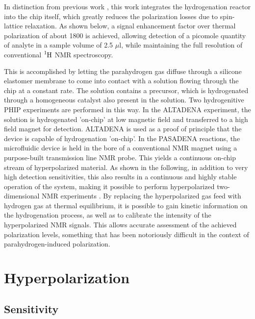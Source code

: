  In distinction from previous work
 \cite{bhattacharya2007towards,chekmenev2008pasadena,
 chekmenev2009hyperpolarized,shchepin2014parahydrogen,
 Reineri:2015he,cavallari201813,eills2017singlet,Lehmkuhl:2018cd},
 this work integrates the hydrogenation reactor into the chip itself, which greatly
 reduces the polarization losses due to spin-lattice relaxation.
 As shown below, a signal enhancement factor over thermal polarization
 of about 1800 is achieved, allowing detection of a
 picomole quantity of analyte in a sample volume of 2.5 $\mu$l,
 while maintaining the full resolution of conventional $\ce{^1H}$
 NMR spectroscopy.

 This is accomplished by letting the parahydrogen gas diffuse through a
 silicone elastomer membrane \cite{Lehmkuhl:2018cd}
 to come into contact with a solution
 flowing through the chip at a constant rate. The solution
 contains a precursor, which is hydrogenated through a homogeneous
 catalyst also present in the solution. Two hydrogenitive PHIP experiments are performed in
 this way. In the ALTADENA experiment, the solution is hydrogenated 'on-chip' at low magnetic field
 and transferred to a high field magnet for detection. ALTADENA is used as a proof of principle that the device
 is capable of hydrogenation 'on-chip'. In the PASADENA reactions,
 the microfluidic device is held in the bore of a conventional
 NMR magnet using a purpose-built transmission line NMR probe.
 This yields a continuous on-chip stream of hyperpolarized material. As shown
 in the following, in addition to very high detection
 sensitivities, this also results in a continuous and highly stable operation
 of the system, making it possible to perform hyperpolarized
 two-dimensional NMR experiments \cite{Roth:2010hk,Giraudeau:2009fn,Lloyd:2012cf,Eshuis:2015ce}.
 By replacing the hyperpolarized gas feed with hydrogen gas at thermal
 equilibrium, it is possible to gain kinetic information on the hydrogenation
 process, as well as to calibrate the intensity of the hyperpolarized NMR signals.
 This allows accurate assessment of the achieved polarization levels, something
 that has been notoriously difficult in the context of
 parahydrogen-induced polarization.

 \section{Hyperpolarization}


 \subsection{Sensitivity}\label{Sensitivity}


